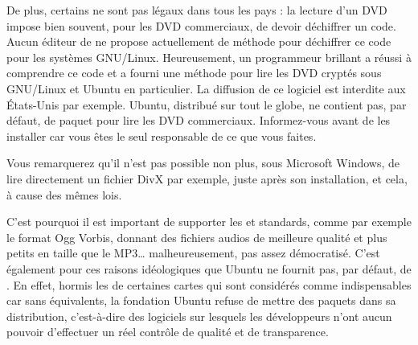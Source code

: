 De plus, certains  ne sont pas légaux dans tous les pays : la lecture d'un DVD impose bien souvent, pour les DVD commerciaux, de devoir déchiffrer un code.  Aucun éditeur de  ne propose actuellement de méthode pour déchiffrer ce code pour les systèmes GNU/Linux. Heureusement, un programmeur brillant a réussi à comprendre ce code et a fourni une méthode pour lire les DVD cryptés sous GNU/Linux et Ubuntu en particulier. La diffusion de ce logiciel est interdite aux États-Unis par exemple. Ubuntu, distribué sur tout le globe, ne contient pas, par défaut, de paquet pour lire les DVD commerciaux. Informez-vous avant de les installer car vous êtes le seul responsable de ce que vous faites.\par
\begin{nota}
Vous remarquerez qu'il n'est pas possible non plus, sous Microsoft Windows, de lire directement un fichier DivX par exemple, juste après son installation, et cela, à cause des mêmes lois.
\end{nota}
C'est pourquoi il est important de supporter les   et standards, comme par exemple le format Ogg Vorbis, donnant des fichiers audios de meilleure qualité et plus petits en taille que le MP3\ldots{} malheureusement, pas assez démocratisé. C'est également pour ces raisons idéologiques que Ubuntu ne fournit pas, par défaut, de  . En effet, hormis les   de certaines cartes  qui sont considérés comme indispensables car sans équivalents, la fondation Ubuntu refuse de mettre des paquets  dans sa distribution, c'est-à-dire des logiciels sur lesquels les développeurs n'ont aucun pouvoir d'effectuer un réel contrôle de qualité et de transparence.
